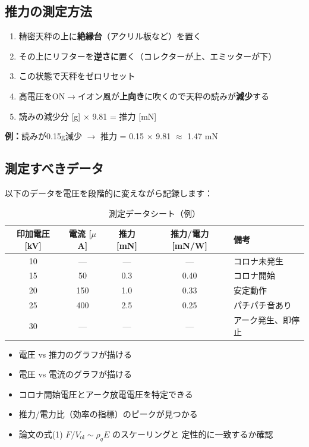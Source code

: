 \documentclass[12pt,a4paper]{ltjsarticle}
\begin{document}
\subsection{推力の測定方法}

\begin{infobox}[title={逆さ吊り法（推奨・簡単）}]
\begin{enumerate}[leftmargin=2em]
  \item 精密天秤の上に\textbf{絶縁台}（アクリル板など）を置く
  \item その上にリフターを\textbf{逆さに}置く（コレクターが上、エミッターが下）
  \item この状態で天秤をゼロリセット
  \item 高電圧をON$\to$イオン風が\textbf{上向き}に吹くので天秤の読みが\textbf{減少}する
  \item 読みの減少分 [g] $\times$ 9.81 = 推力 [mN]
\end{enumerate}
\textbf{例：}読みが0.15g減少 $\to$ 推力 = 0.15 $\times$ 9.81 $\approx$ 1.47 mN
\end{infobox}

\subsection{測定すべきデータ}

以下のデータを電圧を段階的に変えながら記録します：

\begin{table}[h]
\centering
\sffamily\small
\caption{測定データシート（例）}
\begin{tabular}{@{}ccccl@{}}
\toprule
\textbf{印加電圧 [kV]} & \textbf{電流 [$\mu$A]} & \textbf{推力 [mN]}
& \textbf{推力/電力 [mN/W]} & \textbf{備考} \\
\midrule
10 & --- & --- & --- & コロナ未発生 \\
15 & 50 & 0.3 & 0.40 & コロナ開始 \\
20 & 150 & 1.0 & 0.33 & 安定動作 \\
25 & 400 & 2.5 & 0.25 & パチパチ音あり \\
30 & --- & --- & --- & アーク発生、即停止 \\
\bottomrule
\end{tabular}
\end{table}

\begin{successbox}[title={Phase 2の成功基準}]
\begin{itemize}[leftmargin=2em]
  \item 電圧 vs 推力のグラフが描ける
  \item 電圧 vs 電流のグラフが描ける
  \item コロナ開始電圧とアーク放電電圧を特定できる
  \item 推力/電力比（効率の指標）のピークが見つかる
  \item 論文の式(1) $F/V_{\mathrm{ol}} \sim \rho_q E$ のスケーリングと
        定性的に一致するか確認
\end{itemize}
\end{successbox}
\end{document}
